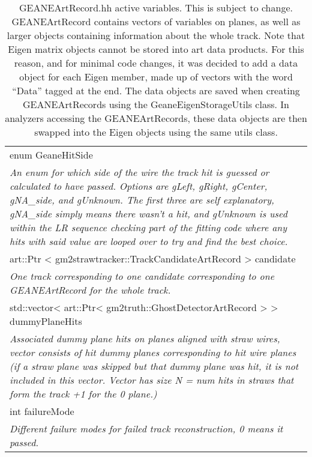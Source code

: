 \begin{longtable}{|p{16cm}|}

\caption{GEANEArtRecord.hh active variables. This is subject to change. GEANEArtRecord contains vectors of variables on planes, as well as larger objects containing information about the whole track. Note that Eigen matrix objects cannot be stored into art data products. For this reason, and for minimal code changes, it was decided to add a data object for each Eigen member, made up of vectors with the word ``Data'' tagged at the end. The data objects are saved when creating GEANEArtRecords using the GeaneEigenStorageUtils class. In analyzers accessing the GEANEArtRecords, these data objects are then swapped into the Eigen objects using the same utils class.}
 
\label{tab:artRecord}


  \\ \hline

enum GeaneHitSide \\ 
\textit{An enum for which side of the wire the track hit is guessed or calculated to have passed. Options are gLeft, gRight, gCenter, gNA\_side, and gUnknown. The first three are self explanatory, gNA\_side simply means there wasn't a hit, and gUnknown is used within the LR sequence checking part of the fitting code where any hits with said value are looped over to try and find the best choice.}

  \\ \hline

art::Ptr \textless{} gm2strawtracker::TrackCandidateArtRecord \textgreater{} candidate \\
\textit{One track corresponding to one candidate corresponding to one GEANEArtRecord for the whole track.} \\ \hline

std::vector\textless{} art::Ptr\textless{} gm2truth::GhostDetectorArtRecord \textgreater{} \textgreater{} dummyPlaneHits \\
\textit{Associated dummy plane hits on planes aligned with straw wires, vector consists of hit dummy planes corresponding to hit wire planes (if a straw plane was skipped but that dummy plane was hit, it is not included in this vector. Vector has size N = num hits in straws that form the track +1 for the 0 plane.)} \\ \hline

int failureMode \\ 
\textit{Different failure modes for failed track reconstruction, 0 means it passed.} \\ \hline


\end{longtable}
